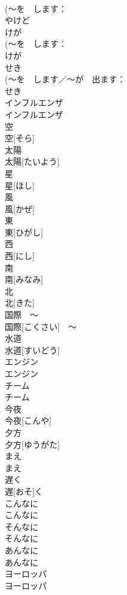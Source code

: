 \documentclass[8pt]{extreport}
\begin{document}
\begin{CJK}{UTF8}{min}
\\	(〜を　します：
\\	やけど	
\\	けが	
\\	(〜を　します：
\\	けが	
\\	せき	
\\	(〜を　します／〜が　出ます：
\\	せき	
\\	インフルエンザ	
\\	インフルエンザ	
\\	空	
\\	空[そら]	
\\	太陽	
\\	太陽[たいよう]	
\\	星	
\\	星[ほし]	
\\	風	
\\	風[かぜ]	
\\	東	
\\	東[ひがし]	
\\	西	
\\	西[にし]	
\\	南	
\\	南[みなみ]	
\\	北	
\\	北[きた]	
\\	国際　〜	
\\	国際[こくさい]　〜	
\\	水道	
\\	水道[すいどう]	
\\	エンジン	
\\	エンジン	
\\	チーム	
\\	チーム	
\\	今夜	
\\	今夜[こんや]	
\\	夕方	
\\	夕方[ゆうがた]	
\\	まえ	
\\	まえ	
\\	遅く	
\\	遅[おそ]く	
\\	こんなに	
\\	こんなに	
\\	そんなに	
\\	そんなに	
\\	あんなに	
\\	あんなに	
\\	ヨーロッパ	
\\	ヨーロッパ	

\end{CJK}
\end{document}
